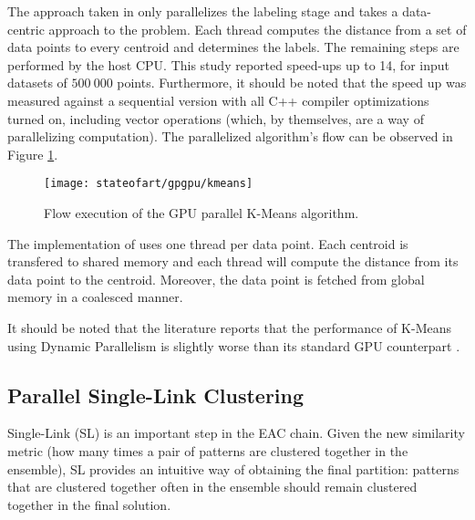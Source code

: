 The approach taken in \cite{Zechner2009b} only parallelizes the labeling stage and takes a data-centric approach to the problem.
Each thread computes the distance from a set of data points to every centroid and determines the labels.
The remaining steps are performed by the host CPU.
This study reported speed-ups up to 14, for input datasets of $500\:000$ points.
Furthermore, it should be noted that the speed up was measured against a sequential version with all C++ compiler optimizations turned on, including vector operations (which, by themselves, are a way of parallelizing computation).
The parallelized algorithm's flow can be observed in Figure \ref{fig:kmeans}.

\begin{figure}[hbtp]
	\centering
	\texttt{[image: stateofart/gpgpu/kmeans]}
	\caption{Flow execution of the GPU parallel K-Means algorithm.}
	\label{fig:kmeans}
\end{figure}

The implementation of \citet{Zechner2009b} uses one thread per data point.
Each centroid is transfered to shared memory and each thread will compute the distance from its data point to the centroid.
Moreover, the data point is fetched from global memory in a coalesced manner.

It should be noted that the literature reports that the performance of K-Means using Dynamic Parallelism is slightly worse than its standard GPU counterpart \cite{DiMarco2013}.

\subsection{Parallel Single-Link Clustering}
\label{sec:parallel_SL}

Single-Link (SL) is an important step in the EAC chain.
Given the new similarity metric (how many times a pair of patterns are clustered together in the ensemble), SL provides an intuitive way of obtaining the final partition: patterns that are clustered together often in the ensemble should remain clustered together in the final solution.


